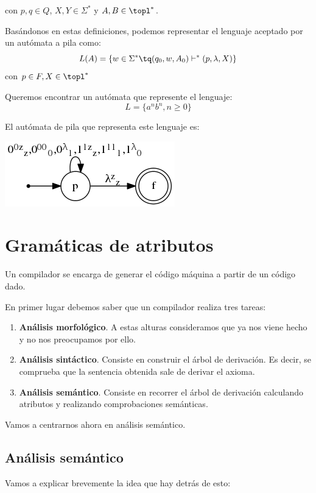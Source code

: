 \documentclass{apuntes}
\begin{document}
\noindent con $p, q \in Q$, $X, Y \in \Sigma^{*}$ y $A, B \in \topl^{*}$.

Basándonos en estas definiciones, podemos representar el lenguaje aceptado por un autómata a pila como:
\[L(A) = \lbrace w \in \Sigma^* \tq (q_0, w, A_0) \vdash^* (p, \lambda, X)\rbrace\]
con $p\in F, X \in \topl^*$

\begin{example}
Queremos encontrar un autómata que represente el lenguaje:
\[L = \lbrace a^nb^n, n \geq 0\rbrace\]

El autómata de pila que representa este lenguaje es:

\begin{center}
\includegraphics[scale=0.75]{automata6.png}
\end{center}
\end{example}

\newpage
\chapter{Gramáticas de atributos}
Un compilador se encarga de generar el código máquina a partir de un código dado.

En primer lugar debemos saber que un compilador realiza tres tareas:
\begin{enumerate}
\item \textbf{Análisis morfológico}. A estas alturas consideramos que ya nos viene hecho y no nos preocupamos por ello.
\item \textbf{Análisis sintáctico}. Consiste en construir el árbol de derivación. Es decir, se comprueba que la sentencia obtenida sale de derivar el axioma.
\item \textbf{Análisis semántico}. Consiste en recorrer el árbol de derivación calculando atributos y realizando comprobaciones semánticas.
\end{enumerate}

Vamos a centrarnos ahora en análisis semántico.
\section{Análisis semántico}

Vamos a explicar brevemente la idea que hay detrás de esto:
\end{document}

